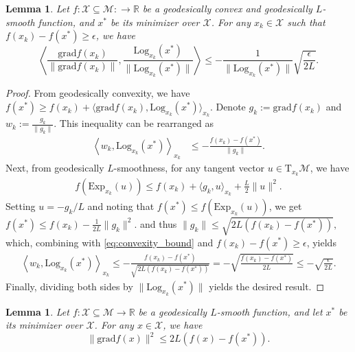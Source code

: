 \documentclass{article}
\newcommand{\rgrad}{\mathrm{grad}}
\newcommand{\Log}{\mathrm{Log}}
\theoremstyle{plain}
\newtheorem{lemma}[theorem]{Lemma}
\theoremstyle{definition}
\theoremstyle{remark}
\begin{document}
\begin{lemma}\label{lem:inner_product_nt_logx}
Let $f:\mathcal{X}\subseteq\mathcal{M}:\rightarrow\mathbb{R}$ be a geodesically convex and geodesically ${L}$-smooth function, and $x^*$ be its minimizer over $\mathcal{X}$. For any $x_k\in\mathcal{X}$ such that $f(x_k)-f(x^*)\geq\epsilon$, we have $$\left\langle \frac{\rgrad f (x_k)}{\|\rgrad f(x_k)\|}, \frac{\Log_{x_k}(x^*)}{\|\Log_{x_k}(x^*)\|} \right\rangle \leq -\frac{1}{\|\Log_{x_k}(x^*)\|}\sqrt{\frac{ \epsilon}{2{L}}}.$$
\end{lemma}

\begin{proof}
From geodesically convexity, we have
$
f(x^*) \geq f(x_k) + \langle \rgrad f(x_k), \Log_{x_k}(x^*) \rangle_{x_k}.
$
Denote $g_k:=\rgrad f(x_k)$ and $w_k :=\frac{g_k}{\|g_k\|}$. 
This inequality can be rearranged as
\begin{align}\label{eq:convexity_bound}
\left\langle w_{k}, \Log_{x_k}(x^*)\right\rangle_{x_k} 
&\leq -\frac{f(x_k) - f(x^*)}{\|g_{k}\|} .
\end{align}
Next, from geodesically ${L}$-smoothness, for any tangent vector $u \in \mathrm{T}_{x_k}\mathcal{M}$, we have
\begin{align*}
f(\mathrm{Exp}_{x_k}(u)) \leq f(x_k) + \langle g_k, u \rangle_{x_k} + \frac{L}{2}\|u\|^2.
\end{align*}
Setting $u = -g_k/L$ and noting that $f(x^*) \leq f(\mathrm{Exp}_{x_k}(u))$, we get
$
f(x^*) \leq f(x_k) - \frac{1}{2L}\|g_k\|^2.
$
and thus 
$
\|g_{k}\| \leq \sqrt{2{L}\left(f(x_k) - f(x^*)\right)},
$
which, combining with \eqref{eq:convexity_bound} and $f(x_k) - f(x^*) \geq \epsilon$, yields
\begin{align*}
\left\langle w_{k}, \Log_{x_k}(x^*) \right\rangle_{x_k} 
\leq -\frac{f(x_k) - f(x^*)}{\sqrt{2{L}(f(x_k) - f(x^*))}} = -\sqrt{\frac{f(x_k) - f(x^*)}{2{L}}} \leq -\sqrt{\frac{ \epsilon}{2{L}}}.
\end{align*}
Finally, dividing both sides by $\|\Log_{x_k}(x^*)\|$ yields the desired result. 
\end{proof}

\begin{lemma}\label{lem:LG_smooth}
Let $f: \mathcal{X} \subseteq \mathcal{M} \to \mathbb{R}$ be a geodesically ${L}$-smooth function, and let $x^*$ be its minimizer over $\mathcal{X}$. For any $x \in \mathcal{X}$, we have 
$$\|\rgrad f(x)\|^2 \leq 2L(f(x) - f(x^*)).$$
\end{lemma}
\end{document}
